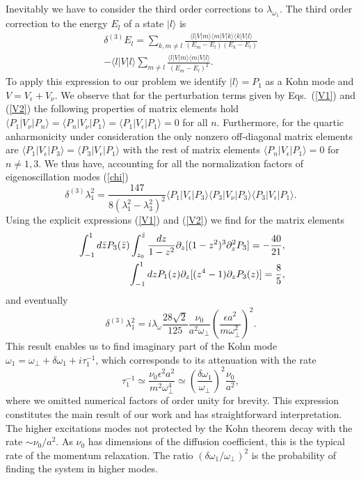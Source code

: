 Inevitably we have to consider the third order corrections to $\lambda_{\omega_1}$. 
The third order correction to the energy $E_l$ of a state $|l\rangle$ is 
\begin{eqnarray}
\delta^{(3)} E_l=\sum_{k,m\neq l}\frac{\langle l|V|m\rangle\langle m|V|k\rangle\langle k|V|l\rangle}{(E_m-E_l)(E_k-E_l)}\nonumber\\
-\langle l|V|l \rangle\sum_{m\neq l}\frac{\langle l|V|m\rangle\langle m|V|l\rangle}{(E_m-E_l)^2}. 
\end{eqnarray}
To apply this expression to our problem we identify $|l\rangle=P_1$ as a Kohn mode and $V=V_\epsilon+V_\nu$. We observe that for the perturbation terms given by Eqs.~(\ref{V1}) and (\ref{V2}) the following properties of matrix elements hold $\langle P_1|V_\nu|P_n\rangle=\langle P_n|V_\nu|P_1\rangle=\langle P_1|V_\epsilon|P_1\rangle=0$ for all $n$. Furthermore, for the quartic anharmonicity under consideration the only nonzero off-diagonal matrix elements are $\langle P_1|V_\epsilon|P_3\rangle=\langle P_3|V_\epsilon|P_1\rangle$ with the rest of matrix elements $\langle P_n|V_\epsilon|P_1\rangle=0$ for $n\neq1,3$. We thus have, accounting for all the normalization factors of eigenoscillation modes (\ref{chi}) 
\begin{equation}
\delta^{(3)}\lambda^2_1=\frac{147}{8(\lambda^2_1-\lambda^2_3)^2}\langle P_1|V_\epsilon|P_3\rangle
\langle P_3|V_\nu|P_3\rangle
\langle P_3|V_\epsilon|P_1\rangle.
\end{equation}
Using the explicit expressions (\ref{V1}) and (\ref{V2}) we find for the matrix elements 
\begin{eqnarray}
&&\hskip-.25cm\int^{1}_{-1}d\bar{z}P_3(\bar{z})\int^{\bar{z}}_{z_0}\frac{dz}{1-z^2}\partial_z[(1-z^2)^3\partial^2_zP_3]=-\frac{40}{21},\\
&&\hskip-.25cm\int^{1}_{-1}dz P_1(z)\partial_z[(z^4-1)\partial_zP_3(z)]=\frac{8}{5},
\end{eqnarray}
and eventually
\begin{equation}
\delta^{(3)}\lambda^2_1=i\lambda_\omega\frac{28\sqrt{2}}{125}\frac{\nu_0}{a^2\omega_\perp}
\left(\frac{\epsilon a^2}{m\omega^2_\perp}\right)^2.
\end{equation}
This result enables us to find imaginary part of the Kohn mode $\omega_1=\omega_\perp+\delta\omega_1+i\tau^{-1}_1$, which corresponds to its attenuation with the rate 
\begin{equation}\label{tau-K}
\tau^{-1}_1\simeq\frac{\nu_0\epsilon^2a^2}{m^2\omega^4_\perp}\simeq\left(\frac{\delta\omega_1}{\omega_\perp}\right)^2\frac{\nu_0}{a^2},
\end{equation}
where we omitted numerical factors of order unity for brevity. This expression constitutes the main result of our work and has straightforward interpretation. The higher excitations modes not protected by the Kohn theorem decay with the rate $\sim\nu_0/a^2$. As $\nu_0$ has dimensions of the diffusion coefficient, this is the typical rate of the momentum relaxation. The ratio $(\delta\omega_1/\omega_\perp)^2$ is the probability of finding the system in higher modes.    

 

